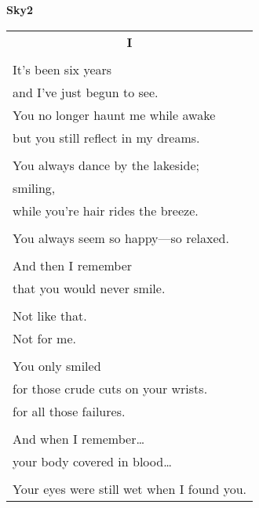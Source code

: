 \documentclass{article}
\begin{document}
%
%
%
%
%
%

\newcommand{\h}{\hspace*{2ex}}
\newcommand{\HHHH}{\hspace*{32ex}}
\begin{center}
{\large\textbf{Sky2}} \\
\begin{tabular}{l}
\multicolumn{1}{c}{\large\textbf{I}} \\
\\
It's been six years \\
\h and I've just begun to see. \\
You no longer haunt me while awake \\
\h but you still reflect in my dreams. \\
\\
You always dance by the lakeside; \\
\h smiling, \\
\h\h while you're hair rides the breeze. \\
\\
You always seem so happy---so relaxed. \\
\\
And then I remember \\
\h that you would never smile. \\
\\
Not like that. \\
Not for me. \\
\\
You only smiled \\
\h for those crude cuts on your wrists. \\
\h for all those failures. \\
\\
And when I remember\ldots{} \\
\h your body covered in blood\ldots{} \\
\\
Your eyes were still wet when I found you. \\

\end{tabular}
\end{center}
\end{document}
